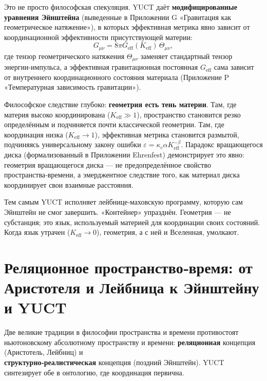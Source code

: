 \documentclass[12pt,a4paper]{article}
\begin{document}
	Это не просто философская спекуляция. YUCT даёт \textbf{модифицированные уравнения Эйнштейна} (выведенные в Приложении G «Гравитация как геометрическое натяжение»), в которых эффективная метрика явно зависит от координационной эффективности присутствующей материи:
	\[
	G_{\mu\nu} = 8\pi G_{\mathrm{eff}}(K_{\mathrm{eff}}) \, \Theta_{\mu\nu},
	\]
	где тензор геометрического натяжения \(\Theta_{\mu\nu}\) заменяет стандартный тензор энергии‑импульса, а эффективная гравитационная постоянная \(G_{\mathrm{eff}}\) сама зависит от внутреннего координационного состояния материала (Приложение P «Температурная зависимость гравитации»).
	
	Философское следствие глубоко: \textbf{геометрия есть тень материи}. Там, где материя высоко координирована (\(K_{\mathrm{eff}} \gg 1\)), пространство становится резко определённым и подчиняется почти классической геометрии. Там, где координация низка (\(K_{\mathrm{eff}} \to 1\)), эффективная метрика становится размытой, подчиняясь универсальному закону ошибки \(\varepsilon = \kappa_c \alpha K_{\mathrm{eff}}^{-\beta}\). Парадокс вращающегося диска (формализованный в Приложении Ehrenfest) демонстрирует это явно: геометрия вращающегося диска — не предопределённое свойство пространства‑времени, а эмерджентное следствие того, как материал диска координирует свои взаимные расстояния.
	
	Тем самым YUCT исполняет лейбнице‑маховскую программу, которую сам Эйнштейн не смог завершить. «Контейнер» упразднён. Геометрия — не субстанция; это язык, используемый материей для координации своих состояний. Когда язык утрачен (\(K_{\mathrm{eff}} \to 0\)), геометрия, а с ней и Вселенная, умолкают.
	
	\section{Реляционное пространство‑время: от Аристотеля и Лейбница к Эйнштейну и YUCT}
	
	Две великие традиции в философии пространства и времени противостоят ньютоновскому абсолютному пространству и времени: \textbf{реляционная} концепция (Аристотель, Лейбниц) и \\ \textbf{структурно‑реалистическая} концепция (поздний Эйнштейн). YUCT синтезирует обе в онтологию, где координация первична.
	
\end{document}
